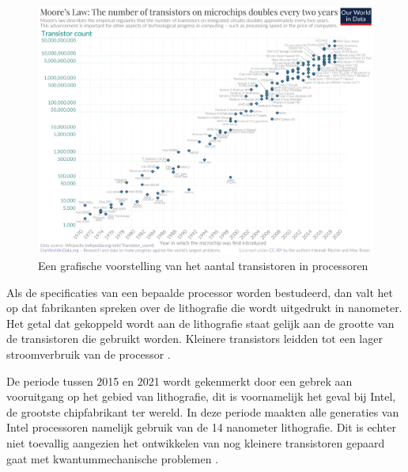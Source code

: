\begin{figure}[!htb]
    \centering
    \includegraphics[width=\linewidth]{img/transistorcountovertime.jpg}
    \caption{Een grafische voorstelling van het aantal transistoren in processoren \autocite{HannahRitchie2020}}
\end{figure}

Als de specificaties van een bepaalde processor worden bestudeerd, dan valt het op dat fabrikanten spreken over de lithografie die wordt uitgedrukt in nanometer. Het getal dat gekoppeld wordt aan de lithografie staat gelijk aan de grootte van de transistoren die gebruikt worden. Kleinere transistors leidden tot een lager stroomverbruik van de processor \autocite{Heddings2019}.

De periode tussen 2015 en 2021 wordt gekenmerkt door een gebrek aan vooruitgang op het gebied van lithografie, dit is voornamelijk het geval bij Intel, de grootste chipfabrikant ter wereld. In deze periode maakten alle generaties van Intel processoren namelijk gebruik van de 14 nanometer lithografie. Dit is echter niet toevallig aangezien het ontwikkelen van nog kleinere transistoren gepaard gaat met kwantummechanische problemen \autocite{Intel2021}.

